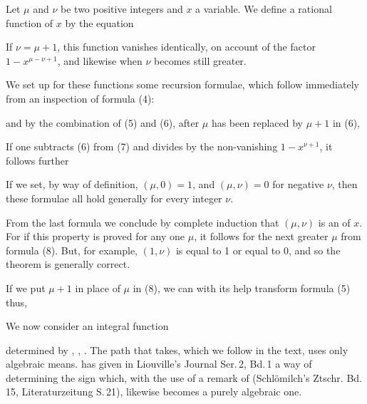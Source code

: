 
Let $\mu$ and $\nu$ be two positive integers and $x$ a
variable. We define a rational function of $x$ by
the equation


If $\nu = \mu + 1$, this function vanishes
identically, on account of the factor $1 - x^{\mu - \nu + 1}$, and likewise when $\nu$
becomes still greater.

We set up for these functions some recursion formulae,
which follow immediately from an inspection of formula (4):



and by the combination of (5) and (6), after $\mu$ has been
replaced by $\mu + 1$ in (6),


If one subtracts (6) from (7) and divides by the non-vanishing $1 - x^{\nu + 1}$, it follows further


If we set, by way of definition, $(\mu, 0) = 1$, and $(\mu, \nu) = 0$ for
negative $\nu$, then these formulae all hold generally for every
integer $\nu$.

From the last formula we conclude by complete
induction that $(\mu, \nu)$ is an  of $x$. For
if this property is proved for any one $\mu$, it follows for
the next greater $\mu$ from formula (8). But, for example,
$(1, \nu)$ is equal to 1 or equal to 0, and so the theorem is generally correct.

If we put $\mu + 1$ in place of $\mu$ in (8), we can
with its help transform formula (5) thus,


We now consider an integral function


determined by , , . The path that
 takes, which we follow in the text, uses only algebraic
means.  has given in Liouville's Journal Ser.\,2, Bd.\,1 a
way of determining the sign which, with the use of a
remark of  (Schlömilch's Ztschr. Bd.\,15, Literaturzeitung
S.\,21), likewise becomes a purely algebraic one.
